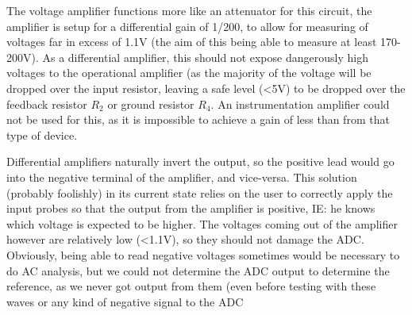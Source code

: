 The voltage amplifier functions more like an attenuator for this circuit, the amplifier is setup for a differential gain of 1/200, to allow for measuring of voltages far in excess of 1.1V (the aim of this being able to measure at least 170-200V). As a differential amplifier, this should not expose dangerously high voltages to the operational amplifier (as the majority of the voltage will be dropped over the input resistor, leaving a safe level (<5V) to be dropped over the feedback resistor $R_2$ or ground resistor $R_4$. An instrumentation amplifier could not be used for this, as it is impossible to achieve a gain of less than from that type of device.

Differential amplifiers naturally invert the output, so the positive lead would go into the negative terminal of the amplifier, and vice-versa. This solution (probably foolishly) in its current state relies on the user to correctly apply the input probes so that the output from the amplifier is positive, IE: he knows which voltage is expected to be higher. The voltages coming out of the amplifier however are relatively low (<1.1V), so they should not damage the ADC. Obviously, being able to read negative voltages sometimes would be necessary to do AC analysis, but we could not determine the ADC output to determine the reference, as we never got output from them (even before testing with these waves or any kind of negative signal to the ADC